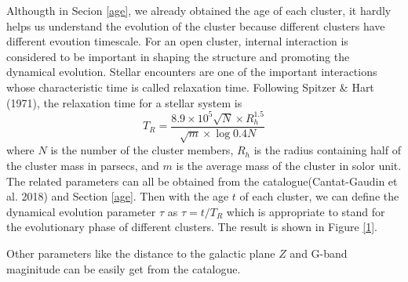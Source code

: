 \documentclass[modern]{aastex63}
\begin{document}
Althougth in Secion \ref{age}, we already obtained the age of each cluster, it hardly helps us understand the evolution of the cluster because different clusters have different evoution timescale. For an open cluster, internal interaction is considered to be important in shaping the structure and promoting the dynamical evolution. Stellar encounters are one of the important interactions whose characteristic time is called relaxation time. Following Spitzer \& Hart (1971), the relaxation time for a stellar system is
\begin{equation*}
T_R=\frac{8.9\times10^5\sqrt{N}\times R^{1.5}_h}{\sqrt{m}\times \log{0.4N}}
\end{equation*}
where $N$ is the number of the cluster members, $R_h$ is the radius containing half of the cluster mass in parsecs, and $m$ is the average mass of the cluster in solor unit. The related parameters can all be obtained from the catalogue(Cantat-Gaudin et al. 2018) and Section \ref{age}. Then with the age $t$ of each cluster, we can define the dynamical evolution parameter $\tau$ as $\tau=t/T_R$ which is appropriate to stand for the evolutionary phase of different clusters.
The result is shown in Figure \ref{1}.

Other parameters like the distance to the galactic plane $Z$ and G-band maginitude can be easily get from the catalogue.
\end{document}
